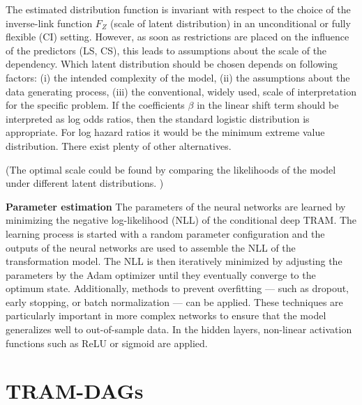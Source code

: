 The estimated distribution function is invariant with respect to the choice of the inverse-link function $F_Z$ (scale of latent distribution) in an unconditional \citep{hothorn2018} or fully flexible (CI) setting. However, as soon as restrictions are placed on the influence of the predictors (LS, CS), this leads to assumptions about the scale of the dependency. Which latent distribution should be chosen depends on following factors: (i) the intended complexity of the model, (ii) the assumptions about the data generating process, (iii) the conventional, widely used, scale of interpretation for the specific problem. If the coefficients $\beta$ in the linear shift term should be interpreted as log odds ratios, then the standard logistic distribution is appropriate. For log hazard ratios it would be the minimum extreme value distribution. There exist plenty of other alternatives.

(The optimal scale could be found by comparing the likelihoods of the model under different latent distributions. )



\textbf{Parameter estimation } The parameters of the neural networks are learned by  minimizing the negative log-likelihood (NLL) of the conditional deep TRAM. The learning process is started with a random parameter configuration and the outputs of the neural networks are used to assemble the NLL of the transformation model. The NLL is then iteratively minimized by adjusting the parameters by the Adam optimizer \citep{kingma2015} until they eventually converge to the optimum state. Additionally, methods to prevent overfitting --- such as dropout, early stopping, or batch normalization --- can be applied. These techniques are particularly important in more complex networks to ensure that the model generalizes well to out-of-sample data. In the hidden layers, non-linear activation functions such as ReLU or sigmoid are applied.




\section{TRAM-DAGs}



